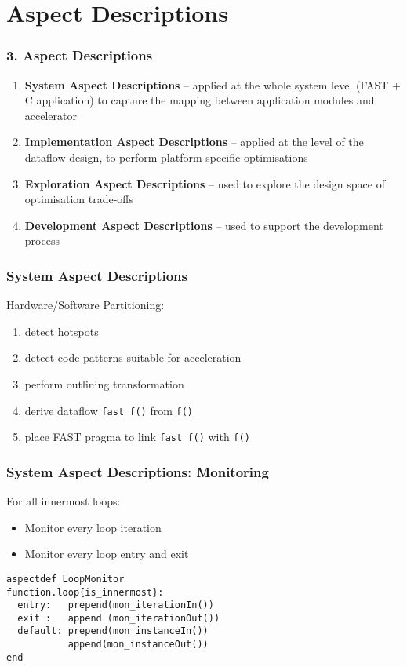 \section{Aspect Descriptions}
\begin{frame}
  \frametitle{3. Aspect Descriptions}
  \begin{enumerate}
  \setlength{\itemsep}{15pt}
  \item \textbf{System Aspect Descriptions} -- applied at the whole
    system level (FAST + C application) to capture the mapping
    between application modules and accelerator
  \item \textbf{Implementation Aspect Descriptions} -- applied at the
    level of the dataflow design, to perform platform specific
    optimisations
  \item \textbf{Exploration Aspect Descriptions} -- used to explore the
    design space of optimisation trade-offs
  \item \textbf{Development Aspect Descriptions}  -- used to support
    the development process
  \end{enumerate}
\end{frame}

\begin{frame}
  \frametitle{System Aspect Descriptions}
  Hardware/Software Partitioning:
  \begin{enumerate}
  \setlength{\itemsep}{10pt}
  \item detect hotspots
  \item detect code patterns suitable for acceleration
  \item perform outlining transformation
  \item derive dataflow \texttt{fast\_f()} from \texttt{f()}
  \item place FAST pragma to link \texttt{fast\_f()} with \texttt{f()}
  \end{enumerate}
\end{frame}



\begin{frame}[fragile]
  \frametitle{System Aspect Descriptions: Monitoring}
  For all innermost loops:
  \begin{itemize}
  \item Monitor every loop iteration
  \item Monitor every loop entry and exit
  \end{itemize}
  \begin{lstlisting}[label=lst:label, style=lara]
aspectdef LoopMonitor
function.loop{is_innermost}:
  entry:   prepend(mon_iterationIn())
  exit :   append (mon_iterationOut())
  default: prepend(mon_instanceIn())
           append(mon_instanceOut())
end
  \end{lstlisting}
\end{frame}

